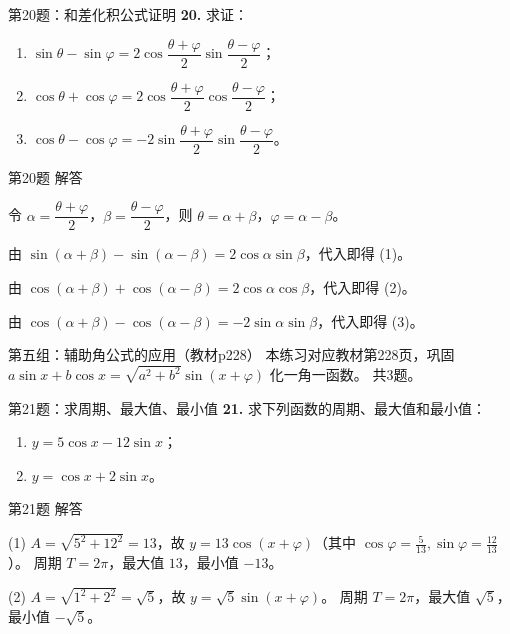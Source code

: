 \documentclass[10pt,aspectratio=169,serif]{beamer}
\begin{document}
\begin{frame}[t]{第20题：和差化积公式证明}
\textbf{20.} 求证：
\begin{enumerate}
  \item $\sin\theta-\sin\varphi=2\cos\dfrac{\theta+\varphi}{2}\sin\dfrac{\theta-\varphi}{2}$；
  \item $\cos\theta+\cos\varphi=2\cos\dfrac{\theta+\varphi}{2}\cos\dfrac{\theta-\varphi}{2}$；
  \item $\cos\theta-\cos\varphi=-2\sin\dfrac{\theta+\varphi}{2}\sin\dfrac{\theta-\varphi}{2}$。
\end{enumerate}
\end{frame}

\begin{frame}[t]{第20题 解答}
\begin{tcolorbox}[colback=orange!10,colframe=orange,title=\textbf{证明}]
令 $\alpha=\dfrac{\theta+\varphi}{2}$，$\beta=\dfrac{\theta-\varphi}{2}$，则 $\theta=\alpha+\beta$，$\varphi=\alpha-\beta$。

由 $\sin(\alpha+\beta)-\sin(\alpha-\beta)=2\cos\alpha\sin\beta$，代入即得 (1)。

由 $\cos(\alpha+\beta)+\cos(\alpha-\beta)=2\cos\alpha\cos\beta$，代入即得 (2)。

由 $\cos(\alpha+\beta)-\cos(\alpha-\beta)=-2\sin\alpha\sin\beta$，代入即得 (3)。
\end{tcolorbox}
\end{frame}

\begin{frame}{第五组：辅助角公式的应用（教材p228）}
本练习对应教材第228页，巩固 $a\sin x+b\cos x=\sqrt{a^2+b^2}\sin(x+\varphi)$ 化一角一函数。
共3题。
\end{frame}

\begin{frame}[t]{第21题：求周期、最大值、最小值}
\textbf{21.} 求下列函数的周期、最大值和最小值：
\begin{enumerate}
  \item $y=5\cos x-12\sin x$；
  \item $y=\cos x+2\sin x$。
\end{enumerate}
\end{frame}

\begin{frame}[t]{第21题 解答}
\begin{tcolorbox}[colback=orange!10,colframe=orange,title=\textbf{解}]
(1) $A=\sqrt{5^2+12^2}=13$，故 $y=13\cos(x+\varphi)$（其中 $\cos\varphi=\frac5{13},\sin\varphi=\frac{12}{13}$）。
周期 $T=2\pi$，最大值 $13$，最小值 $-13$。

(2) $A=\sqrt{1^2+2^2}=\sqrt5$，故 $y=\sqrt5\sin(x+\varphi)$。
周期 $T=2\pi$，最大值 $\sqrt5$，最小值 $-\sqrt5$。
\end{tcolorbox}
\end{frame}
\end{document}
